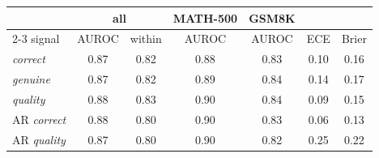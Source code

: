 \begin{tabular}{@{}lcccccc@{}}
\toprule
 & \multicolumn{2}{c}{all} & MATH-500 & GSM8K & & \\ \cmidrule(lr){2-3}
signal & AUROC & within & AUROC & AUROC & ECE & Brier \\ \midrule
\kev{} \emph{correct} & 0.87 & 0.82 & 0.88 & 0.83 & 0.10 & 0.16 \\
\kev{} \emph{genuine} & 0.87 & 0.82 & 0.89 & 0.84 & 0.14 & 0.17 \\
\kev{} \emph{quality} & 0.88 & 0.83 & 0.90 & 0.84 & 0.09 & 0.15 \\
AR \emph{correct} & 0.88 & 0.80 & 0.90 & 0.83 & 0.06 & 0.13 \\
AR \emph{quality} & 0.87 & 0.80 & 0.90 & 0.82 & 0.25 & 0.22 \\
\bottomrule
\end{tabular}
